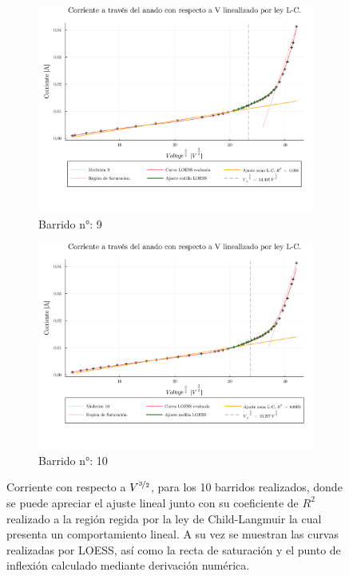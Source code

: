 \begin{figure}[H]
	\ContinuedFloat %
	\centering
	\begin{subfigure}[b]{0.49\textwidth}
		\centering
		\includegraphics[width=\linewidth]{img/pot9.png}
		\caption{Barrido n°: 9}
		\label{fig:pot9}
	\end{subfigure}
	\hfill
	\begin{subfigure}[b]{0.49\textwidth}
		\centering
		\includegraphics[width=\linewidth]{img/pot10.png}
		\caption{Barrido n°: 10}
		\label{fig:pot10}
	\end{subfigure}
	
	\caption{Corriente con respecto a $V^{\nicefrac{3}{2}}$, para los 10 barridos realizados, donde se puede apreciar el ajuste lineal junto con su coeficiente de $R^{2}$ realizado a la región regida por la ley de Child-Langmuir la cual presenta un comportamiento lineal. A su vez se muestran las curvas realizadas por LOESS, así como la recta de saturación y el punto de inflexión calculado mediante derivación numérica.}
	\label{fig:pots}
\end{figure}

